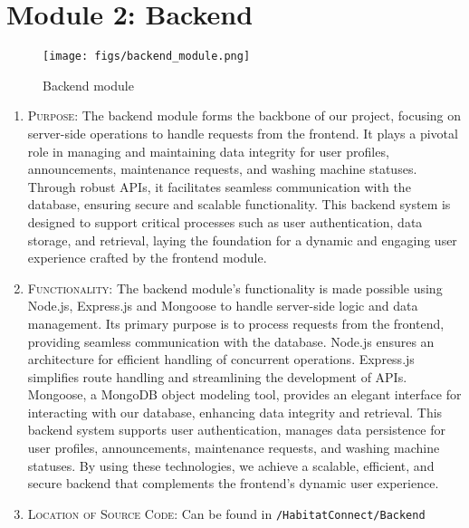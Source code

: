 \documentclass[conference]{IEEEtran}
\begin{document}
\section*{Module 2: Backend}
    \begin{figure}[H]
    \centering
    \texttt{[image: figs/backend\_module.png]}
    \caption{Backend module}
    \label{fig:Backend module}
    \end{figure}
    
\begin{enumerate}
    \item \textsc{Purpose:} The backend module forms the backbone of our project, focusing on server-side operations to handle requests from the frontend. It plays a pivotal role in managing and maintaining data integrity for user profiles, announcements, maintenance requests, and washing machine statuses. Through robust APIs, it facilitates seamless communication with the database, ensuring secure and scalable functionality. This backend system is designed to support critical processes such as user authentication, data storage, and retrieval, laying the foundation for a dynamic and engaging user experience crafted by the frontend module.

    \item \textsc{Functionality:} The backend module’s functionality is made possible using Node.js, Express.js and Mongoose to handle server-side logic and data management. Its primary purpose is to process requests from the frontend, providing seamless communication with the database. Node.js ensures an architecture for efficient handling of concurrent operations. Express.js simplifies route handling and streamlining the development of APIs. Mongoose, a MongoDB object modeling tool, provides an elegant interface for interacting with our database, enhancing data integrity and retrieval. This backend system supports user authentication, manages data persistence for user profiles, announcements, maintenance requests, and washing machine statuses. By using these technologies, we achieve a scalable, efficient, and secure backend that complements the frontend's dynamic user experience.

    \item \textsc{Location of Source Code:} Can be found in \texttt{/HabitatConnect/Backend}


\end{enumerate}
\end{document}
